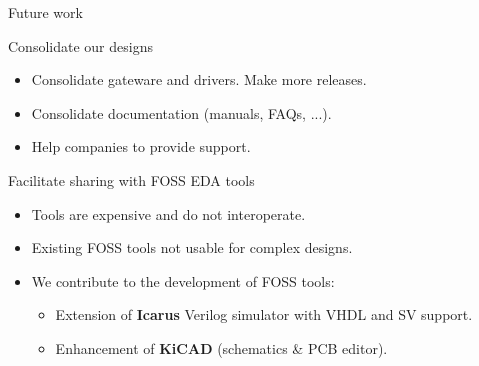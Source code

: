 \documentclass[compress,red]{beamer}
\begin{document}
\begin{frame}{Future work}

  \begin{block}{Consolidate our designs}
    \begin{itemize}
    \item Consolidate gateware and drivers. Make more releases.
    \item Consolidate documentation (manuals, FAQs, ...).
    \item Help companies to provide support.
    \end{itemize}
  \end{block}

  \begin{block}{Facilitate sharing with FOSS EDA tools}
    \begin{itemize}
    \item Tools are expensive and do not interoperate.
    \item Existing FOSS tools not usable for complex designs.
    \item We contribute to the development of FOSS tools:
      \begin{itemize}
      \item Extension of \textbf{Icarus} Verilog simulator with VHDL and SV support. %
      \item Enhancement of \textbf{KiCAD} (schematics \& PCB editor).
      \end{itemize}
    \end{itemize}
  \end{block}

  \note[item]{}

\end{frame}
\end{document}
